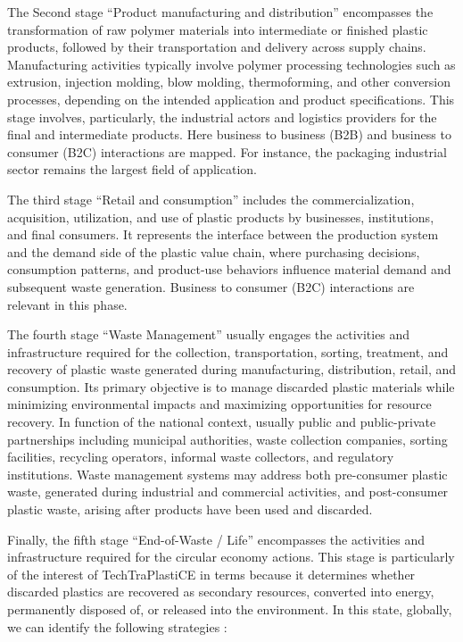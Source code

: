 \documentclass[
  12pt,
  oneside]{book}
\begin{document}
The Second stage ``Product manufacturing and distribution'' encompasses
the transformation of raw polymer materials into intermediate or
finished plastic products, followed by their transportation and delivery
across supply chains. Manufacturing activities typically involve polymer
processing technologies such as extrusion, injection molding, blow
molding, thermoforming, and other conversion processes, depending on the
intended application and product specifications. This stage involves,
particularly, the industrial actors and logistics providers for the
final and intermediate products. Here business to business (B2B) and
business to consumer (B2C) interactions are mapped. For instance, the
packaging industrial sector remains the largest field of application.

The third stage ``Retail and consumption'' includes the
commercialization, acquisition, utilization, and use of plastic products
by businesses, institutions, and final consumers. It represents the
interface between the production system and the demand side of the
plastic value chain, where purchasing decisions, consumption patterns,
and product-use behaviors influence material demand and subsequent waste
generation. Business to consumer (B2C) interactions are relevant in this
phase.

The fourth stage ``Waste Management'' usually engages the activities and
infrastructure required for the collection, transportation, sorting,
treatment, and recovery of plastic waste generated during manufacturing,
distribution, retail, and consumption. Its primary objective is to
manage discarded plastic materials while minimizing environmental
impacts and maximizing opportunities for resource recovery. In function
of the national context, usually public and public-private partnerships
including municipal authorities, waste collection companies, sorting
facilities, recycling operators, informal waste collectors, and
regulatory institutions. Waste management systems may address both
pre-consumer plastic waste, generated during industrial and commercial
activities, and post-consumer plastic waste, arising after products have
been used and discarded.

Finally, the fifth stage ``End-of-Waste / Life'' encompasses the
activities and infrastructure required for the circular economy actions.
This stage is particularly of the interest of TechTraPlastiCE in terms
because it determines whether discarded plastics are recovered as
secondary resources, converted into energy, permanently disposed of, or
released into the environment. In this state, globally, we can identify
the following strategies :
\end{document}
